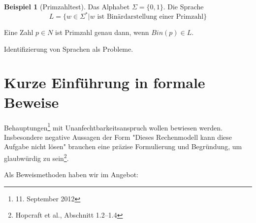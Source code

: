 \documentclass[11pt]{article} %
\theoremstyle{definition}
\newtheorem*{beispiel}{Beispiel}
\begin{document}
\begin{beispiel}[Primzahltest]
Das Alphabet $\Sigma = \{0,1\}$. Die Sprache 
\[
L = \{w \in \Sigma^* | w \textrm{ ist Binärdarstellung einer Primzahl}  \}
\]

Eine Zahl $p \in N$ ist Primzahl genau dann, wenn $Bin(p) \in L$.

Identifizierung von Sprachen als Probleme.
\end{beispiel}

\section{Kurze Einführung in formale Beweise}

Behauptungen\footnote{11. September 2012} mit Unanfechtbarkeitsanspruch wollen bewiesen werden. Insbesondere negative Aussagen der Form "Dieses Rechenmodell kann diese Aufgabe nicht lösen" brauchen eine präzise Formulierung und Begründung, um glaubwürdig zu sein\footnote{Hopcraft et al., Abschnitt 1.2--1.4}.

Als Beweismethoden haben wir im Angebot:
\end{document}

